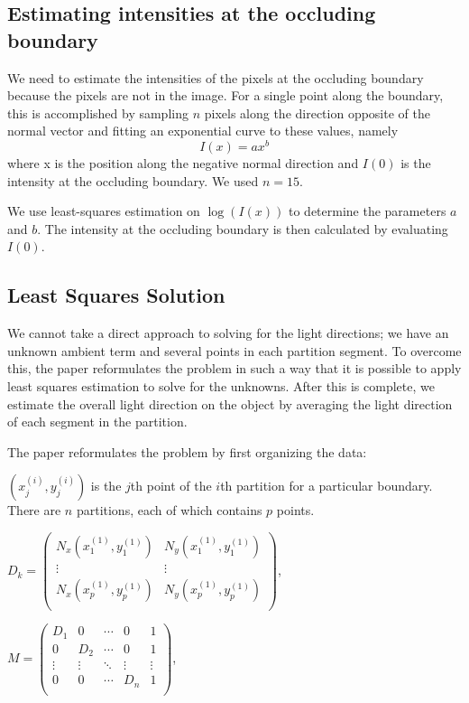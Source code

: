 \documentclass[10pt,twocolumn,letterpaper]{article}
\begin{document}
\subsection{Estimating intensities at the occluding boundary}
We need to estimate the intensities of the pixels at the occluding boundary because the pixels are not in the image. For a single point along the boundary, this is accomplished by sampling $n$ pixels along the direction opposite of the normal vector and fitting an exponential curve to these values, namely \[I(x) = ax^{b}\] where x is the position along the negative normal direction and $I(0)$ is the intensity at the occluding boundary. We used $n = 15$.

We use least-squares estimation on $\log(I(x))$ to determine the parameters $a$ and $b$. The intensity at the occluding boundary is then calculated by evaluating $I(0)$.

\subsection{Least Squares Solution}
We cannot take a direct approach to solving for the light directions; we have an unknown ambient term and several points in each partition segment. To overcome this, the paper reformulates the problem in such a way that it is possible to apply least squares estimation to solve for the unknowns. After this is complete, we estimate the overall light direction on the object by averaging the light direction of each segment in the partition.

The paper reformulates the problem by first organizing the data:

$(x^{(i)}_j,y^{(i)}_j)$ is the $j$th point of the $i$th partition for a particular boundary. There are $n$ partitions, each of which contains $p$ points.

$D_k = 
\begin{pmatrix}
N_x(x^{(1)}_1,y^{(1)}_1) & N_y(x^{(1)}_1,y^{(1)}_1) \\
	\vdots & \vdots\\
	N_x(x^{(1)}_p,y^{(1)}_p) & N_y(x^{(1)}_p,y^{(1)}_p) \\
	\end{pmatrix}$,

	
$M = 
	\begin{pmatrix}
	D_1 & 0 &\cdots & 0 & 1\\
	0 & D_2 &\cdots & 0 & 1\\
 	\vdots & \vdots & \ddots & \vdots& \vdots\\
	0 & 0 & \cdots & D_n & 1\\
	\end{pmatrix}$,
	
\end{document}

